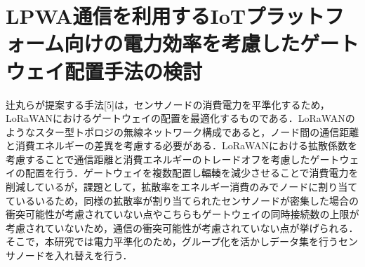 \section{LPWA通信を利用するIoTプラットフォーム向けの電力効率を考慮したゲートウェイ配置手法の検討}
辻丸らが提案する手法[5]は，センサノードの消費電力を平準化するため，LoRaWANにおけるゲートウェイの配置を最適化するものである．LoRaWANのようなスター型トポロジの無線ネットワーク構成であると，ノード間の通信距離と消費エネルギーの差異を考慮する必要がある．LoRaWANにおける拡散係数を考慮することで通信距離と消費エネルギーのトレードオフを考慮したゲートウェイの配置を行う．ゲートウェイを複数配置し輻輳を減少させることで消費電力を削減しているが，課題として，拡散率をエネルギー消費のみでノードに割り当てているいるため，同様の拡散率が割り当てられたセンサノードが密集した場合の衝突可能性が考慮されていない点やこちらもゲートウェイの同時接続数の上限が考慮されていないため，通信の衝突可能性が考慮されていない点が挙げられる．そこで，本研究では電力平準化のため，グループ化を活かしデータ集を行うセンサノードを入れ替えを行う．